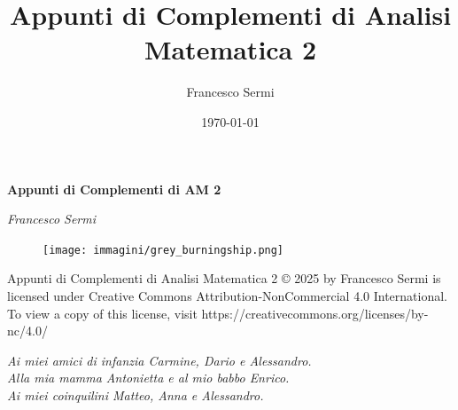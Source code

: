 \documentclass[12pt, twoside, italian]{book}
\title{Appunti di Complementi di Analisi Matematica 2}
\author{Francesco Sermi}
\date{\today}
\begin{document}
	\begin{titlepage}
	\centering
	\vspace*{3cm}
	{\huge\bfseries Appunti di Complementi di AM 2 \par}
	\vspace{2cm}
	{\Large\itshape Francesco Sermi\par}
	\vfill
	\begin{figure}[H]
		\centering
		\texttt{[image: immagini/grey\_burningship.png]}
	\end{figure}




	\vfill	
	\end{titlepage}
	\pagestyle{empty}
	\vspace*{\fill}
	Appunti di Complementi di Analisi Matematica 2 © 2025 by Francesco Sermi is licensed under Creative Commons Attribution-NonCommercial 4.0 International. To view a copy of this license, visit https://creativecommons.org/licenses/by-nc/4.0/
	\cleardoublepage
	\vspace*{8cm}
	\begin{center}
			\begin{flushright}
				\small\emph{Ai miei amici di infanzia Carmine, Dario e Alessandro. \\
				Alla mia mamma Antonietta e al mio babbo Enrico. \\
				Ai miei coinquilini Matteo, Anna e Alessandro. \\
				}
			\end{flushright}
		\vspace*{\fill}
	\end{center}
	\cleardoublepage
	\pagestyle{fancy}
	\tableofcontents
\end{document}
